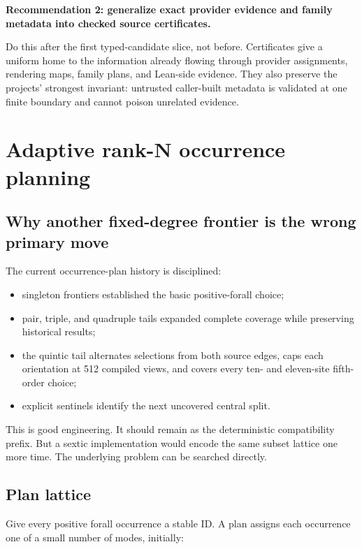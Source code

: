\documentclass[11pt]{article}
\newenvironment{recommendation}[1]
{\par\medskip\noindent\colorbox{GoodBg}{\parbox{\dimexpr\linewidth-2\fboxsep\relax}{\sffamily\bfseries #1}}\par\smallskip}
{\par\medskip}
\begin{document}
\begin{recommendation}{Recommendation 2: generalize exact provider evidence and family metadata into checked source certificates.}
Do this after the first typed-candidate slice, not before.  Certificates give a
uniform home to the information already flowing through provider assignments,
rendering maps, family plans, and Lean-side evidence.  They also preserve the
projects' strongest invariant: untrusted caller-built metadata is validated at
one finite boundary and cannot poison unrelated evidence.
\end{recommendation}

\section{Adaptive rank-N occurrence planning}
\label{sec:adaptive-plans}

\subsection{Why another fixed-degree frontier is the wrong primary move}

The current occurrence-plan history is disciplined:

\begin{itemize}
  \item singleton frontiers established the basic positive-forall choice;
  \item pair, triple, and quadruple tails expanded complete coverage while
    preserving historical results;
  \item the quintic tail alternates selections from both source edges, caps
    each orientation at 512 compiled views, and covers every ten- and
    eleven-site fifth-order choice;
  \item explicit sentinels identify the next uncovered central split.
\end{itemize}

This is good engineering.  It should remain as the deterministic compatibility
prefix.  But a sextic implementation would encode the same subset lattice one
more time.  The underlying problem can be searched directly.

\subsection{Plan lattice}

Give every positive forall occurrence a stable ID.  A plan assigns each
occurrence one of a small number of modes, initially:
\end{document}
